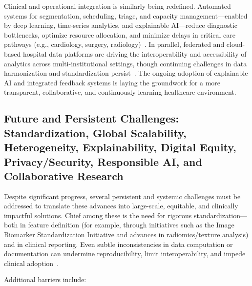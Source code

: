 Clinical and operational integration is similarly being redefined. Automated systems for segmentation, scheduling, triage, and capacity management—enabled by deep learning, time-series analytics, and explainable AI—reduce diagnostic bottlenecks, optimize resource allocation, and minimize delays in critical care pathways (e.g., cardiology, surgery, radiology)~\cite{ref49,ref72,ref73,ref74,ref75,ref76,ref100,ref101}. In parallel, federated and cloud-based hospital data platforms are driving the interoperability and accessibility of analytics across multi-institutional settings, though continuing challenges in data harmonization and standardization persist~\cite{ref88,ref89}. The ongoing adoption of explainable AI and integrated feedback systems is laying the groundwork for a more transparent, collaborative, and continuously learning healthcare environment.

\subsection{Future and Persistent Challenges: Standardization, Global Scalability, Heterogeneity, Explainability, Digital Equity, Privacy/Security, Responsible AI, and Collaborative Research}

Despite significant progress, several persistent and systemic challenges must be addressed to translate these advances into large-scale, equitable, and clinically impactful solutions. Chief among these is the need for rigorous standardization—both in feature definition (for example, through initiatives such as the Image Biomarker Standardization Initiative and advances in radiomics/texture analysis) and in clinical reporting. Even subtle inconsistencies in data computation or documentation can undermine reproducibility, limit interoperability, and impede clinical adoption~\cite{ref5,ref13,ref16,ref17,ref18,ref19,ref20,ref21,ref22,ref23,ref24,ref25,ref28,ref30,ref31,ref32,ref33,ref34,ref35,ref36,ref37,ref38,ref39,ref40,ref41,ref42,ref43,ref44,ref45,ref46,ref47,ref48,ref49,ref50,ref51,ref52,ref53,ref54,ref55,ref56,ref57,ref58,ref59,ref60,ref61,ref62,ref63,ref64,ref65,ref66,ref67,ref68,ref69,ref70,ref71,ref72,ref73,ref74,ref75,ref76,ref77,ref78,ref79,ref80,ref81,ref82,ref83,ref84,ref85,ref86,ref87,ref88,ref89,ref90,ref91,ref92,ref94,ref95,ref96,ref97,ref98,ref99,ref100,ref101,ref102,ref103,ref104,ref105,ref106,ref107}.

Additional barriers include:

